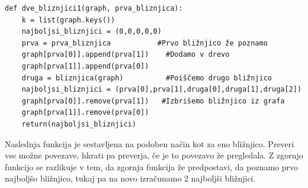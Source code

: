 \documentclass[a4paper,10pt]{article}
\begin{document}
\begin{verbatim}
def dve_bliznjici1(graph, prva_bliznjica):
    k = list(graph.keys())
    najboljsi_bliznjici = (0,0,0,0,0)
    prva = prva_bliznjica           #Prvo bližnjico že poznamo
    graph[prva[0]].append(prva[1])    #Dodamo v drevo
    graph[prva[1]].append(prva[0])  
    druga = bliznjica(graph)          #Poiščemo drugo bližnjico
    najboljsi_bliznjici = (prva[0],prva[1],druga[0],druga[1],druga[2])
    graph[prva[0]].remove(prva[1])   #Izbrišemo bližnjico iz grafa
    graph[prva[1]].remove(prva[0])
    return(najboljsi_bliznjici)
\end{verbatim}

Naslednja funkcija je sestavljena na podoben način kot za eno bližnjico. Preveri vse možne povezave, hkrati pa preverja, če je to povezavo že pregledala. Z zgornjo funkcijo se razlikuje v tem, da zgornja funkcija že predpostavi, da poznamo prvo najboljšo bližnjico, tukaj pa na novo izračunamo 2 najboljši bližnjici.
\end{document}
